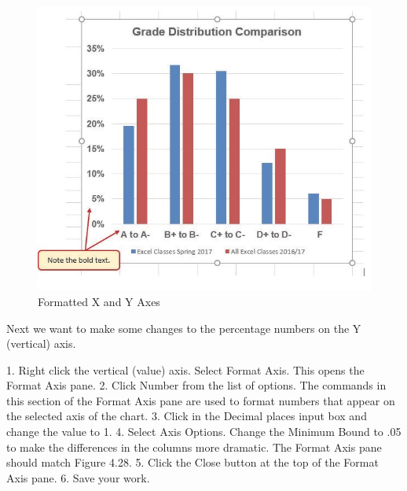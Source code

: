 \begin{figure}[H]
	\centering
	\includegraphics[width=\maxwidth{.95\linewidth}]{gfx/ch04_fig28}
	\caption{Formatted X and Y Axes}
	\label{04:fig28}
\end{figure}





Next we want to make some changes to the percentage numbers on the Y (vertical) axis.

1. Right click the vertical (value) axis. Select Format Axis. This opens the Format Axis pane.
2. Click Number from the list of options. The commands in this section of the Format Axis pane
are used to format numbers that appear on the selected axis of the chart.
3. Click in the Decimal places input box and change the value to 1.
4. Select Axis Options. Change the Minimum Bound to .05 to make the differences in the
columns more dramatic. The Format Axis pane should match Figure 4.28.
5. Click the Close button at the top of the Format Axis pane.
6. Save your work.


